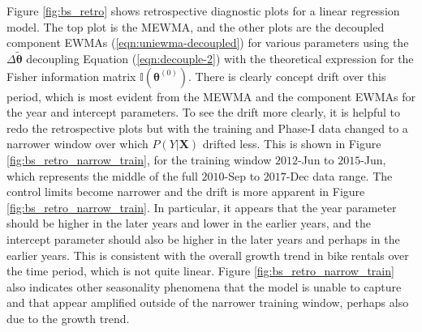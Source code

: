 \documentclass[twoside,11pt]{article}
\begin{document}
Figure \ref{fig:bs_retro} shows retrospective diagnostic plots for a linear regression model. The top plot is the MEWMA, and the other plots are the decoupled component EWMAs (\ref{eqn:uniewma-decoupled}) for various parameters using the $\Delta \tilde{\bm { \theta}}$ decoupling Equation (\ref{eqn:decouple-2}) with the theoretical expression for the Fisher information matrix $\mathbb {I}(\bm { \theta}^{ (0)})$. There is clearly concept drift over this period, which is most evident from the MEWMA and the component EWMAs for the year and intercept parameters. To see the drift more clearly, it is helpful to redo the retrospective plots but with the training and Phase-I data changed to a narrower window over which $P(Y|\bm{X})$ drifted less. This is shown in Figure \ref{fig:bs_retro_narrow_train}, for the training window $2012$-Jun to $2015$-Jun, which represents the middle of the full $2010$-Sep to $2017$-Dec data range. The control limits become narrower and the drift is more apparent in Figure \ref{fig:bs_retro_narrow_train}. In particular, it appears that the year parameter should be higher in the later years and lower in the earlier years, and the intercept parameter should also be higher in the later years and perhaps in the earlier years. This is consistent with the overall growth trend in bike rentals over the time period, which is not quite linear. Figure \ref{fig:bs_retro_narrow_train} also indicates other seasonality phenomena that the model is unable to capture and that appear amplified outside of the narrower training window, perhaps also due to the growth trend.  
\end{document}
